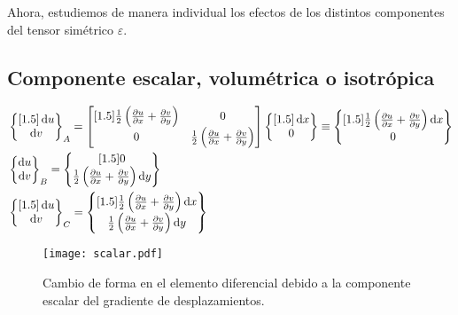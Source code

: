 \documentclass[../notas medios.tex]{subfiles}
\begin{document}
Ahora, estudiemos de manera individual los efectos de los distintos componentes 
del tensor simétrico $\varepsilon$.

\subsection{Componente escalar, volumétrica o isotrópica}

\begin{align*}
&\begin{Bmatrix}[1.5]
\dd{u}\\
\dd{v}
\end{Bmatrix}_A = \begin{bmatrix}[1.5]
\frac{1}{2}\left( \pdv{u}{x} + \pdv{v}{y}\right) & 0\\
0 & \frac{1}{2}\left(\pdv{u}{x} + \pdv{v}{y}\right)
\end{bmatrix} \begin{Bmatrix}[1.5]
\dd{x}\\
0
\end{Bmatrix} \equiv \begin{Bmatrix}[1.5]
\frac{1}{2}\left(\pdv{u}{x} + \pdv{v}{y}\right)\dd{x}\\
0
\end{Bmatrix}\\
&\begin{Bmatrix}
\dd{u}\\
\dd{v}
\end{Bmatrix}_B = \begin{Bmatrix}[1.5]
0\\
\frac{1}{2}\left(\pdv{u}{x} + \pdv{v}{y}\right) \dd{y}
\end{Bmatrix}\\
&\begin{Bmatrix}[1.5]
\dd{u}\\
\dd{v}
\end{Bmatrix}_C = \begin{Bmatrix}[1.5]
\frac{1}{2}\left(\pdv{u}{x} + \pdv{v}{y}\right)\dd{x}\\
\frac{1}{2}\left(\pdv{u}{x} + \pdv{v}{y}\right)\dd{y}
\end{Bmatrix}
\end{align*}

\begin{figure}[H]
\centering
	\texttt{[image: scalar.pdf]}
	\caption{Cambio de forma en el elemento diferencial debido a la componente escalar del gradiente de desplazamientos.}
	\label{scalar}
\end{figure}
\end{document}

